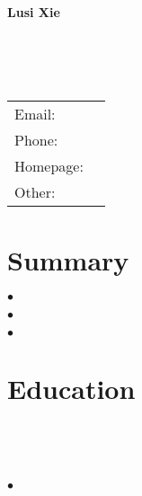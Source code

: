\documentclass[letterpaper]{article}
\def\name{Lusi Xie}
\renewenvironment{itemize}{
  \begin{list}{}{
    \setlength{\leftmargin}{1.5em}
  }
}{
  \end{list}
}
\begin{document}

\centerline{\huge \bf \name}

\vspace{0.25in}

\begin{minipage}{0.65\linewidth}
   \\ %
   \\ %
   \\ %
\end{minipage}
\begin{minipage}{0.25\linewidth}
  \begin{tabular}{ll}
    Email: &  \href{mailto:}{\tt } \\
    Phone: &  \\
    Homepage: & \href{}{\tt } \\ 
    Other: & \href}{\faGithub}  \href{}{\faLinkedin}
    \href{}{\faTwitter}\\

  \end{tabular}
\end{minipage}

\vspace{-0.1in}

\section*{Summary}
\begin{itemize}
	\setlength{\itemindent}{-.12in}
	\item $\bullet$  \\[-0.25in]
	\item $\bullet$  \\[-0.25in]
	\item $\bullet$  \\[-0.25in]

\end{itemize}

\vspace{-0.15in}

\section*{Education}
\begin{itemize}
  \item \textbf{} \hfill{} \\[-0.25in] %
  \item \textit{}\\[-0.25in] %
	\begin{itemize}
  		\setlength{\itemindent}{-.16in}
  		\item $\bullet$  \\[-0.2in]
  	\end{itemize}
\end{itemize}
\end{document}
